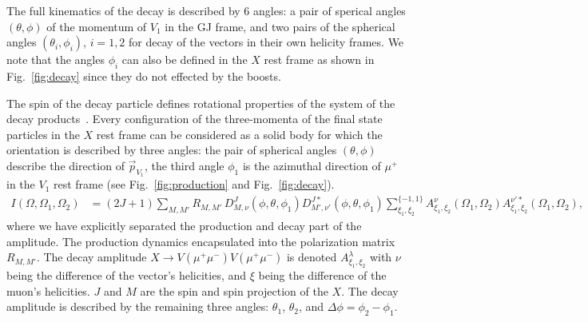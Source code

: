 \documentclass[prd,preprintnumbers,floatfix,
nofootinbib,superscriptaddress]{revtex4}
\newcommand{\diff}{\mathrm{d}}
\begin{document}
The full kinematics of the decay is described by 6 angles: a pair of sperical angles $(\theta,\phi)$ of the momentum of $V_1$ in the GJ frame, and two pairs of the spherical angles $(\theta_i,\phi_i)$, $i=1,2$
for decay of the vectors in their own helicity frames.
We note that the angles $\phi_i$ can also be defined in the $X$ rest frame as shown in Fig.~\ref{fig:decay}
since they do not effected by the boosts.

The spin of the decay particle defines rotational properties of the system of the decay products~\cite{DPD}.
Every configuration of the three-momenta of the final state particles in the $X$ rest frame
can be considered as a solid body for which the orientation is described by three angles:
the pair of spherical angles $(\theta,\phi)$ describe the direction of $\vec p_{V_1}$,
the third angle $\phi_1$ is the azimuthal direction of $\mu^+$ in the $V_1$ rest frame (see Fig.~\ref{fig:production} and Fig.~\ref{fig:decay}).
%
\begin{align}
    I(\Omega,\Omega_1,\Omega_2) &= (2J+1) \sum_{M,M'}R_{M,M'}\,
    D_{M,\nu}^{J}(\phi,\theta,\phi_1) D_{M',\nu'}^{J*}(\phi,\theta,\phi_1)
    \sum_{\xi_1,\xi_2}^{\{-1,1\}}
    A^{\nu}_{\xi_1,\xi_2}(\Omega_1,\Omega_2) A^{\nu'*}_{\xi_1,\xi_2}(\Omega_1,\Omega_2),
\end{align}
where we have explicitly separated the production and decay part of the amplitude.
The production dynamics encapsulated into the polarization matrix $R_{M,M'}$.
The decay amplitude $X\to V(\mu^+\mu^-)V(\mu^+\mu^-)$ is denoted $A^{\lambda}_{\xi_1,\xi_2}$
with $\nu$ being the difference of the vector's helicities, and $\xi$ being the difference of the muon's helicities. $J$ and $M$ are the spin and spin projection of the $X$.
The decay amplitude is described by the remaining three angles: $\theta_1$, $\theta_2$, and $\Delta\phi = \phi_2-\phi_1$.
\end{document}
